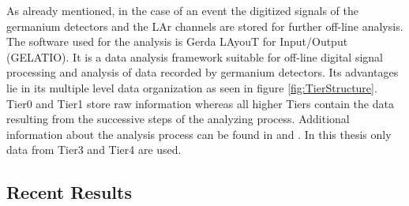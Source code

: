 \documentclass[encoding=utf8,british]{tumphthesis}
\begin{document}
As already mentioned, in the case of an event the digitized signals of the germanium detectors and the LAr channels are stored for further off-line analysis.
The software used for the analysis is Gerda LAyouT for Input/Output (GELATIO).
It is a data analysis framework suitable for off-line digital signal processing and analysis of data recorded by germanium detectors.
Its advantages lie in its multiple level data organization as seen in figure \ref{fig:TierStructure}.
Tier0 and Tier1 store raw information whereas all higher Tiers contain the data resulting from the successive steps of the analyzing process.
Additional information about the analysis process can be found in \cite{agostini_gelatio:_2011} and \cite{agostini_off-line_2011}.
In this thesis only data from Tier3 and Tier4 are used.
\\

\subsection{Recent Results}
\end{document}
